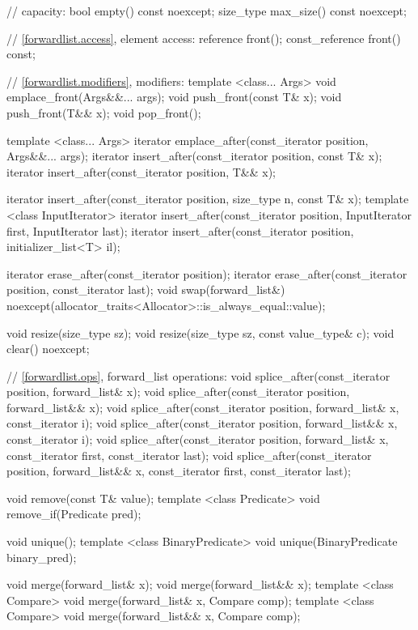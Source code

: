 \begin{codeblock}
{{    // capacity:
    bool empty() const noexcept;
    size_type max_size() const noexcept;

    // \ref{forwardlist.access}, element access:
    reference front();
    const_reference front() const;

    // \ref{forwardlist.modifiers}, modifiers:
    template <class... Args> void emplace_front(Args&&... args);
    void push_front(const T& x);
    void push_front(T&& x);
    void pop_front();

    template <class... Args> iterator emplace_after(const_iterator position, Args&&... args);
    iterator insert_after(const_iterator position, const T& x);
    iterator insert_after(const_iterator position, T&& x);

    iterator insert_after(const_iterator position, size_type n, const T& x);
    template <class InputIterator>
      iterator insert_after(const_iterator position, InputIterator first, InputIterator last);
    iterator insert_after(const_iterator position, initializer_list<T> il);

    iterator erase_after(const_iterator position);
    iterator erase_after(const_iterator position, const_iterator last);
    void swap(forward_list&)
      noexcept(allocator_traits<Allocator>::is_always_equal::value);

    void resize(size_type sz);
    void resize(size_type sz, const value_type& c);
    void clear() noexcept;

    // \ref{forwardlist.ops}, forward_list operations:
    void splice_after(const_iterator position, forward_list& x);
    void splice_after(const_iterator position, forward_list&& x);
    void splice_after(const_iterator position, forward_list& x,
                      const_iterator i);
    void splice_after(const_iterator position, forward_list&& x,
                      const_iterator i);
    void splice_after(const_iterator position, forward_list& x,
                      const_iterator first, const_iterator last);
    void splice_after(const_iterator position, forward_list&& x,
                      const_iterator first, const_iterator last);

    void remove(const T& value);
    template <class Predicate> void remove_if(Predicate pred);

    void unique();
    template <class BinaryPredicate> void unique(BinaryPredicate binary_pred);

    void merge(forward_list& x);
    void merge(forward_list&& x);
    template <class Compare> void merge(forward_list& x, Compare comp);
    template <class Compare> void merge(forward_list&& x, Compare comp);

}}
\end{codeblock}
